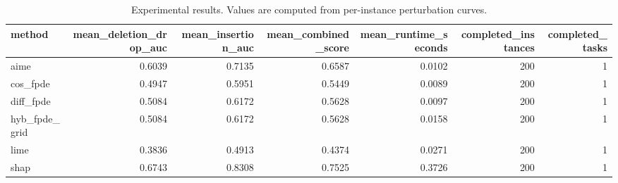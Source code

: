 \begin{table}[t]
\caption{Experimental results. Values are computed from per-instance perturbation curves.}
\label{tab:main_results_computed}
\centering
\begin{tabular}{lrrrrrr}
\toprule
method & mean\_deletion\_drop\_auc & mean\_insertion\_auc & mean\_combined\_score & mean\_runtime\_seconds & completed\_instances & completed\_tasks \\
\midrule
aime & 0.6039 & 0.7135 & 0.6587 & 0.0102 & 200 & 1 \\
cos\_fpde & 0.4947 & 0.5951 & 0.5449 & 0.0089 & 200 & 1 \\
diff\_fpde & 0.5084 & 0.6172 & 0.5628 & 0.0097 & 200 & 1 \\
hyb\_fpde\_grid & 0.5084 & 0.6172 & 0.5628 & 0.0158 & 200 & 1 \\
lime & 0.3836 & 0.4913 & 0.4374 & 0.0271 & 200 & 1 \\
shap & 0.6743 & 0.8308 & 0.7525 & 0.3726 & 200 & 1 \\
\bottomrule
\end{tabular}

\end{table}
